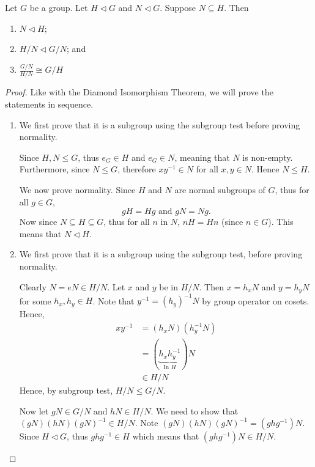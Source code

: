 \begin{theorem}\label{thrm-third-isomorphism}
    Let $G$ be a group. Let $H \lhd G$ and $N \lhd G$. Suppose $N \subseteq H$. Then
    \begin{enumerate}
        \item $N \lhd H$;
        \item $H/N \lhd G/N$; and
        \item $\frac{G/N}{H/N} \cong G/H$
    \end{enumerate}
\end{theorem}
\begin{proof}
    Like with the Diamond Isomorphism Theorem, we will prove the statements in sequence.

    \begin{enumerate}
        \item We first prove that it is a subgroup using the subgroup test before proving normality.

        Since $H, N \leq G$, thus $e_G \in H$ and $e_G \in N$, meaning that $N$ is non-empty. Furthermore, since $N \leq G$, therefore $xy^{-1} \in N$ for all $x, y \in N$. Hence $N \leq H$.

        We now prove normality. Since $H$ and $N$ are normal subgroups of $G$, thus for all $g \in G$,
        \[
            gH = Hg \text{ and } gN = Ng.
        \]
        Now since $N \subseteq H \subseteq G$, thus for all $n$ in $N$, $nH = Hn$ (since $n \in G$). This means that $N \lhd H$.

        \item We first prove that it is a subgroup using the subgroup test, before proving normality.

        Clearly $N = eN \in H/N$. Let $x$ and $y$ be in $H/N$. Then $x=h_xN$ and $y=h_yN$ for some $h_x, h_y \in H$. Note that $y^{-1} = (h_y)^{-1}N$ by group operator on cosets. Hence,
        \begin{align*}
            xy^{-1} &= (h_xN)(h_y^{-1}N)\\
            &= (\underbrace{h_xh_y^{-1}}_{\text{In }H})N\\
            &\in H/N
        \end{align*}
        Hence, by subgroup test, $H/N \leq G/N$.

        Now let $gN \in G/N$ and $hN \in H/N$. We need to show that $(gN)(hN)(gN)^{-1} \in H/N$. Note $(gN)(hN)(gN)^{-1} = (ghg^{-1})N$. Since $H \lhd G$, thus $ghg^{-1} \in H$ which means that $(ghg^{-1})N \in H/N$.


\end{enumerate}
\end{proof}

